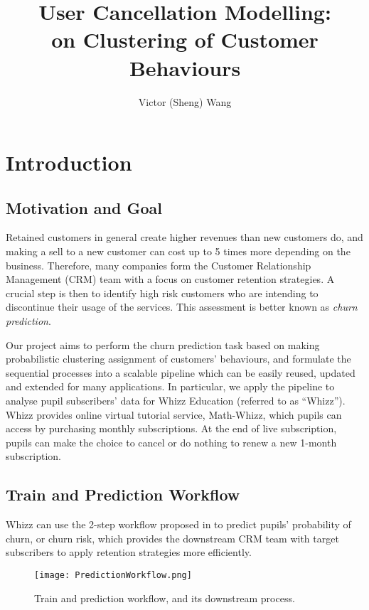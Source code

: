 \documentclass[english,a4,oneside,9pt]{extarticle}
\title{User Cancellation Modelling:
\\on Clustering of Customer Behaviours}
\author{Victor (Sheng) Wang}
\begin{document}




\section{Introduction}
\subsection*{Motivation and Goal}


Retained customers in general create higher revenues than new customers do, and making a sell to a new customer can cost up to 5 times more depending on the business. Therefore, many companies form the Customer Relationship Management (CRM) team with a focus on customer retention strategies. A crucial step is then to identify high risk customers who are intending to discontinue their usage of the services. This assessment is better known as \textit{churn prediction}.

Our project aims to perform the churn prediction task based on making probabilistic clustering assignment of customers' behaviours, and formulate the sequential processes into a scalable pipeline which can be easily reused, updated and extended for many applications. In particular, we apply the pipeline to analyse pupil subscribers' data for Whizz Education (referred to as ``Whizz''). Whizz provides online virtual tutorial service, Math-Whizz, which pupils can access by purchasing monthly subscriptions. At the end of live subscription, pupils can make the choice to cancel or do nothing to renew a new 1-month subscription.

\subsection*{Train and Prediction Workflow}

Whizz can use the 2-step workflow proposed in  to predict pupils' probability of churn, or churn risk, which provides the downstream CRM team with target subscribers to apply retention strategies more efficiently.

\begin{figure}[htb]
\centering
\texttt{[image: PredictionWorkflow.png]}
\caption{Train and prediction workflow, and its downstream process.}
\label{fig:workflow}
\end{figure} 
\end{document}
